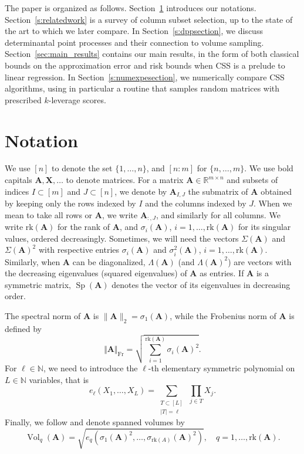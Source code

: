 \documentclass[twoside,11pt]{book}
\numberwithin{theorem}{chapter}
\numberwithin{definition}{chapter}
\numberwithin{proposition}{chapter}
\numberwithin{corollary}{chapter}
\numberwithin{example}{chapter}
\numberwithin{lemma}{chapter}
\numberwithin{assumption}{chapter}
\DeclareMathOperator{\Sp}{\mathrm{Sp}}
\DeclareMathOperator{\Vol}{Vol}
\DeclareMathOperator{\Fr}{\mathrm{Fr}}
\def\rk{\text{rk}}
\begin{document}
The paper is organized as follows. Section~\ref{s:notation} introduces our notations. Section~\ref{s:relatedwork} is a survey of column subset selection, up to the state of the art to which we later compare. In Section~\ref{s:dppsection}, we discuss determinantal point processes and their connection to volume sampling. Section~\ref{sec:main_results} contains our main results, in the form of both classical bounds on the approximation error and risk bounds when CSS is a prelude to linear regression. In Section~\ref{s:numexpesection}, we numerically compare CSS algorithms, using in particular a routine that samples random matrices with prescribed $k$-leverage scores.

\section{Notation}
\label{s:notation}
We use $[n]$ to denote the set $\{1,\dots,n\}$, and $[n:m]$ for $\{n,\dots,m\}$. We use bold capitals $\bm{A},\bm{X},\dots$ to denote matrices. For a matrix $\bm{A} \in \mathbb{R}^{m \times n}$ and subsets of indices $I\subset[m]$ and $J\subset[n]$, we denote by $\bm{A}_{I,J}$ the submatrix of $\bm{A}$ obtained by keeping only the rows indexed by $I$ and the columns indexed by $J$. When we mean to take all rows or $\bm{A}$, we write $\bm A_{:,J}$, and similarly for all columns. We write $\rk (\bm{A})$ for the rank of $\bm{A}$, and $\sigma_i(\bm A)$, $i=1,\dots,\rk(\bm{A})$ for its singular values, ordered decreasingly. Sometimes, we will need the vectors $\Sigma(\bm{A})$ and $\Sigma(\bm{A})^2$ with respective entries $\sigma_i(\bm{A})$ and $\sigma_i^2(\bm{A})$, $i=1,\dots,\rk(\bm{A})$. Similarly, when $\bm{A}$ can be diagonalized, $\Lambda(\bm{A})$ (and $\Lambda(\bm{A})^2$) are vectors with the decreasing eigenvalues (squared eigenvalues) of $\bm{A}$ as entries. If $\bm{A}$ is a symmetric matrix, $\Sp(\bm{A})$ denotes the vector of its eigenvalues in decreasing order.

The spectral norm of $\bm{A}$ is $\|\bm{A}\|_{2} = \sigma_{1}(\bm A)$, while the Frobenius norm of $\bm{A}$ is defined by
$$\Vert\bm{A}\Vert_{\Fr} = \sqrt{\sum_{i=1}^{\rk(\bm{A})} \sigma_{i}(\bm{A})^{2}}.$$
For $\ell \in \mathbb{N}$, we need to introduce the $\ell$-th elementary symmetric polynomial on $L \in \mathbb{N}$ variables, that is
\begin{equation}
e_{\ell}(X_{1}, \dots, X_{L}) = \sum\limits_{\substack{T \subset [L]\\|T| = \ell}}~ \prod\limits_{j \in T} X_{j}.
\end{equation}
Finally, we follow \cite{Ben92} and denote spanned volumes by
$$\Vol_{q}(\bm{A}) = \sqrt{e_{q}\left(\sigma_{1}(\bm{A})^{2},\dots,\sigma_{\rk(A)}(\bm{A})^2\right)}, \quad q=1,\dots,\rk(\bm{A}).$$
\end{document}
